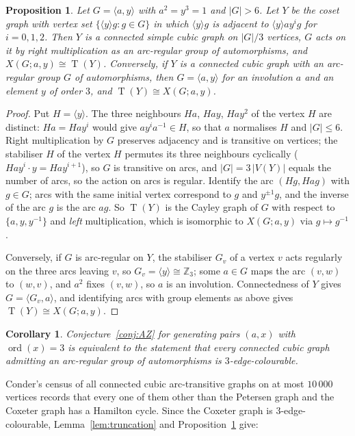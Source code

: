 \documentclass[11pt,a4paper]{article}
\newtheorem{proposition}[theorem]{Proposition}
\newtheorem{corollary}[theorem]{Corollary}
\theoremstyle{definition}
\theoremstyle{remark}
\newcommand{\ord}{\operatorname{ord}}
\newcommand{\ZZ}{\mathbb{Z}}
\newcommand{\X}[3]{X(#1;#2,#3)}
\newcommand{\Tr}{\operatorname{T}}
\begin{document}
\begin{proposition}\label{prop:arcregular}
Let $G=\langle a,y\rangle$ with $a^2=y^3=1$ and $|G|>6$.  Let $Y$ be the coset graph with vertex set $\{\langle y\rangle g: g\in G\}$ in which $\langle y\rangle g$ is adjacent to $\langle y\rangle a y^{i}g$ for $i=0,1,2$.  Then $Y$ is a connected simple cubic graph on $|G|/3$ vertices, $G$ acts on it by right multiplication as an arc-regular group of automorphisms, and $\X{G}{a}{y}\cong\Tr(Y)$.  Conversely, if $Y$ is a connected cubic graph with an arc-regular group $G$ of automorphisms, then $G=\langle a,y\rangle$ for an involution $a$ and an element $y$ of order $3$, and $\Tr(Y)\cong\X{G}{a}{y}$.
\end{proposition}
\begin{proof}
Put $H=\langle y\rangle$.  The three neighbours $Ha$, $Hay$, $Hay^2$ of the vertex $H$ are distinct: $Ha=Hay^{i}$ would give $ay^{i}a^{-1}\in H$, so that $a$ normalises $H$ and $|G|\le 6$.  Right multiplication by $G$ preserves adjacency and is transitive on vertices; the stabiliser $H$ of the vertex $H$ permutes its three neighbours cyclically ($Hay^{i}\cdot y=Hay^{i+1}$), so $G$ is transitive on arcs, and $|G|=3\,|V(Y)|$ equals the number of arcs, so the action on arcs is regular.  Identify the arc $(Hg,Hag)$ with $g\in G$; arcs with the same initial vertex correspond to $g$ and $y^{\pm1}g$, and the inverse of the arc $g$ is the arc $ag$.  So $\Tr(Y)$ is the Cayley graph of $G$ with respect to $\{a,y,y^{-1}\}$ and \emph{left} multiplication, which is isomorphic to $\X{G}{a}{y}$ via $g\mapsto g^{-1}$.

Conversely, if $G$ is arc-regular on $Y$, the stabiliser $G_v$ of a vertex $v$ acts regularly on the three arcs leaving $v$, so $G_v=\langle y\rangle\cong\ZZ_3$; some $a\in G$ maps the arc $(v,w)$ to $(w,v)$, and $a^2$ fixes $(v,w)$, so $a$ is an involution.  Connectedness of $Y$ gives $G=\langle G_v,a\rangle$, and identifying arcs with group elements as above gives $\Tr(Y)\cong\X{G}{a}{y}$.
\end{proof}

\begin{corollary}\label{cor:arcregular}
Conjecture~\ref{conj:AZ} for generating pairs $(a,x)$ with $\ord(x)=3$ is equivalent to the statement that every connected cubic graph admitting an arc-regular group of automorphisms is $3$-edge-colourable.
\end{corollary}

Conder's census \cite{Conder11} of all connected cubic arc-transitive graphs on at most $10\,000$ vertices records that every one of them other than the Petersen graph and the Coxeter graph has a Hamilton cycle.  Since the Coxeter graph is $3$-edge-colourable, Lemma~\ref{lem:truncation} and Proposition~\ref{prop:arcregular} give:
\end{document}
